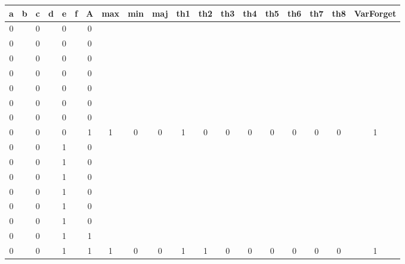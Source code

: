 \begin{table}[!tb]
    \centering
    \begin{tabular}{|c|c|c|c|c|c|c|c|c|c|c|c|c|c|c|c|c|c|c|}
        \hline
        \textbf{a} & \textbf{b} & \textbf{c} & \textbf{d} & \textbf{e} & \textbf{f} & \textbf{A} & \textbf{max} & \textbf{min} & \textbf{maj} & \textbf{th1} & \textbf{th2} & \textbf{th3} & \textbf{th4} & \textbf{th5} & \textbf{th6} & \textbf{th7} & \textbf{th8} & \textbf{VarForget} \\ \hline
        \rowcolor{gray!40} 0 &  & 0 &  & 0 &  & 0 &  &  &  &  &  &  &  &  &  &  &  &  \\ \hline
        \rowcolor{gray!40} 0 &  & 0 &  & 0 &  & 0 &  &  &  &  &  &  &  &  &  &  &  &  \\ \hline
        \rowcolor{gray!40} 0 &  & 0 &  & 0 &  & 0 &  &  &  &  &  &  &  &  &  &  &  &  \\ \hline
        \rowcolor{gray!40} 0 &  & 0 &  & 0 &  & 0 &  &  &  &  &  &  &  &  &  &  &  &  \\ \hline
        \rowcolor{gray!40} 0 &  & 0 &  & 0 &  & 0 &  &  &  &  &  &  &  &  &  &  &  &  \\ \hline
        \rowcolor{gray!40} 0 &  & 0 &  & 0 &  & 0 &  &  &  &  &  &  &  &  &  &  &  &  \\ \hline
        \rowcolor{gray!40} 0 &  & 0 &  & 0 &  & 0 &  &  &  &  &  &  &  &  &  &  &  &  \\ \hline
        \rowcolor{gray!40} 0 &  & 0 &  & 0 &  & 1 & 1 & 0 & 0 & 1 & 0 & 0 & 0 & 0 & 0 & 0 & 0 & 1 \\ \hline
        \rowcolor{blue!40} 0 &  & 0 &  & 1 &  & 0 &  &  &  &  &  &  &  &  &  &  &  &  \\ \hline
        \rowcolor{blue!40} 0 &  & 0 &  & 1 &  & 0 &  &  &  &  &  &  &  &  &  &  &  &  \\ \hline
        \rowcolor{blue!40} 0 &  & 0 &  & 1 &  & 0 &  &  &  &  &  &  &  &  &  &  &  &  \\ \hline
        \rowcolor{blue!40} 0 &  & 0 &  & 1 &  & 0 &  &  &  &  &  &  &  &  &  &  &  &  \\ \hline
        \rowcolor{blue!40} 0 &  & 0 &  & 1 &  & 0 &  &  &  &  &  &  &  &  &  &  &  &  \\ \hline
        \rowcolor{blue!40} 0 &  & 0 &  & 1 &  & 0 &  &  &  &  &  &  &  &  &  &  &  &  \\ \hline
        \rowcolor{blue!40} 0 &  & 0 &  & 1 &  & 1 &  &  &  &  &  &  &  &  &  &  &  &  \\ \hline
        \rowcolor{blue!40} 0 &  & 0 &  & 1 &  & 1 & 1 & 0 & 0 & 1 & 1 & 0 & 0 & 0 & 0 & 0 & 0 & 1 \\ \hline

\end{tabular}
\end{table}

